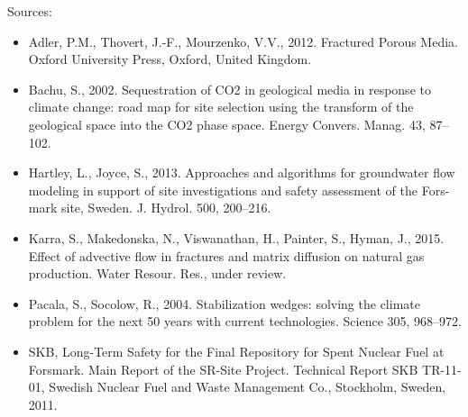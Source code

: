 \documentclass[letterpaper,10pt,english]{sphinxmanual}
\begin{document}
Sources:
\begin{itemize}
\item {} 
Adler, P.M., Thovert, J.-F., Mourzenko, V.V., 2012. Fractured Porous Media. Oxford University Press, Oxford, United Kingdom.

\item {} 
Bachu, S., 2002. Sequestration of CO2 in geological media in response to climate change: road map for site selection using the transform of the geological space into the CO2 phase space. Energy Convers. Manag. 43, 87–102.

\item {} 
Hartley, L., Joyce, S., 2013. Approaches and algorithms for groundwater flow modeling in support of site investigations and safety assessment of the Fors- mark site, Sweden. J. Hydrol. 500, 200–216.

\item {} 
Karra, S., Makedonska, N., Viswanathan, H., Painter, S., Hyman, J., 2015. Effect of advective flow in fractures and matrix diffusion on natural gas production. Water Resour. Res., under review.

\item {} 
Pacala, S., Socolow, R., 2004. Stabilization wedges: solving the climate problem for the next 50 years with current technologies. Science 305, 968–972.

\item {} 
SKB, Long-Term Safety for the Final Repository for Spent Nuclear Fuel at Forsmark. Main Report of the SR-Site Project. Technical Report SKB TR-11-01, Swedish Nuclear Fuel and Waste Management Co., Stockholm, Sweden, 2011.

\end{itemize}
\end{document}
